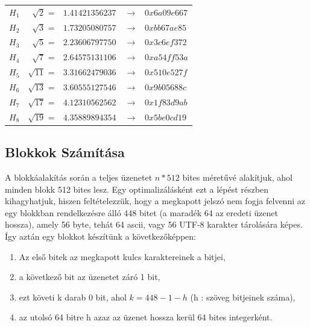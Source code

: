 \begin{tabular}{lrll}

    $H_1$  &  $\sqrt{2}$  =  & $1.41421356237$  &  $\xrightarrow{} \;\;\; 0x6a09e667 $ \\
    $H_2$  &  $\sqrt{3}$  =  & $1.73205080757$  &  $\xrightarrow{} \;\;\; 0xbb67ae85 $ \\
    $H_3$  &  $\sqrt{5}$  =  & $2.23606797750$  &  $\xrightarrow{} \;\;\; 0x3c6ef372 $ \\
    $H_4$  &  $\sqrt{7}$  =  & $2.64575131106$  &  $\xrightarrow{} \;\;\; 0xa54ff53a $ \\
    $H_5$  &  $\sqrt{11}$ =  & $3.31662479036$  &  $\xrightarrow{} \;\;\; 0x510e527f $ \\
    $H_6$  &  $\sqrt{13}$ =  & $3.60555127546$  &  $\xrightarrow{} \;\;\; 0x9b05688c $ \\
    $H_7$  &  $\sqrt{17}$ =  & $4.12310562562$  &  $\xrightarrow{} \;\;\; 0x1f83d9ab $ \\
    $H_8$  &  $\sqrt{19}$ =  & $4.35889894354$  &  $\xrightarrow{} \;\;\; 0x5be0cd19 $ \\

\end{tabular}


\bigbreak




\subsection{Blokkok Számítása}


A blokkáalakítás során a teljes üzenetet $n * 512$ bites méretűvé alakítjuk, ahol minden blokk 512 bites lesz. Egy optimalizálásként ezt a lépést részben kihagyhatjuk, hiszen feltételezzük, hogy a megkapott jelszó nem fogja felvenni az egy blokkban rendelkezésre álló 448 bitet (a maradék 64 az eredeti üzenet hossza), amely 56 byte, tehát 64 ascii, vagy 56 UTF-8 karakter tárolására képes. Így aztán egy blokkot készítünk a következőképpen:


\begin{enumerate}
    \itemsep-0.5em
    \item Az első bitek az megkapott kulcs karaktereinek a bitjei,
    \item a következő bit az üzenetet záró 1 bit,
    \item ezt követi k darab 0 bit, ahol $k = 448 - 1 - h$ (h : szöveg bitjeinek száma),
    \item az utolsó 64 bitre h azaz az üzenet hossza kerül 64 bites integerként.
\end{enumerate}



